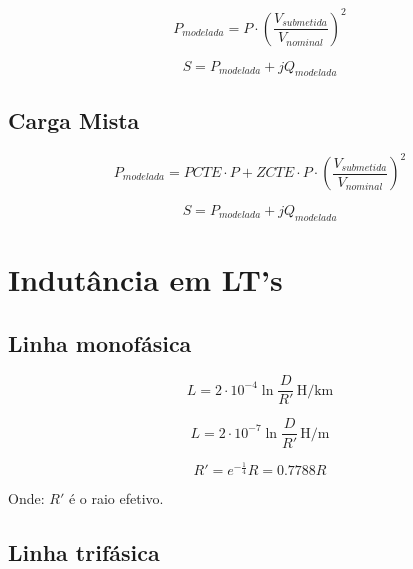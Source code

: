 \documentclass[conference]{IEEEtran}
\newcommand{\unit}[1]{\ensuremath{\, \mathrm{#1}}}
\begin{document}
\begin{equation}
    P_{modelada} = P \cdot \left(\frac{V_{submetida}}{V_{nominal}}\right)^2
\end{equation}

\begin{equation}   
S = P_{modelada} + jQ_{modelada}  
\end{equation}

\subsection{Carga Mista}

\begin{equation}
P_{modelada} =PCTE \cdot P +  ZCTE \cdot  P \cdot \left(\frac{V_{submetida}}{V_{nominal}}\right)^2
\end{equation}

\begin{equation}
S = P_{modelada} + jQ_{modelada}  
\end{equation}

\section{\textbf{Indutância em LT's}}


\subsection{Linha monofásica}

\begin{equation}
L = 2 \cdot 10^{-4} \ln\frac{D}{R'} \unit{H/km}
\end{equation}
    
\begin{equation}
L = 2 \cdot 10^{-7} \ln\frac{D}{R'} \unit{H/m}
\end{equation}

\begin{equation}
R' = e^{-\frac{1}{4}}R = 0.7788R
\end{equation}

Onde: $R'$ é o raio efetivo.

\subsection{Linha trifásica}
\end{document}
